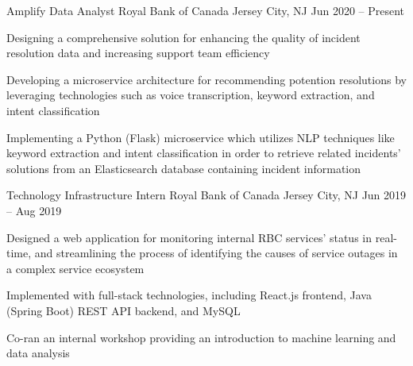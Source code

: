 

\begin{cventries}

  \cventry
	{Amplify Data Analyst}
	{Royal Bank of Canada}
	{Jersey City, NJ}
	{Jun 2020 – Present}
	{
    \begin{cvitems}
		  \item {Designing a comprehensive solution for enhancing the quality of incident resolution data and increasing support team efficiency}
		  \item {Developing a microservice architecture for recommending potention resolutions by leveraging technologies such as voice transcription, keyword extraction, and intent classification}
		  \item {Implementing a Python (Flask) microservice which utilizes NLP techniques like keyword extraction and intent classification in order to retrieve related incidents' solutions from an Elasticsearch database containing incident information}
    \end{cvitems}
  }
  
  
  \cventry
  {Technology Infrastructure Intern}
  {Royal Bank of Canada}
  {Jersey City, NJ}
  {Jun 2019 -- Aug 2019}
  {
    \begin{cvitems}
      \item {Designed a web application for monitoring internal RBC services' status in real-time, and streamlining the process of identifying the causes of service outages in a complex service ecosystem}
      \item {Implemented with full-stack technologies, including React.js frontend, Java (Spring Boot) REST API backend, and MySQL}
      \item {Co-ran an internal workshop providing an introduction to machine learning and data analysis}
    \end{cvitems}
  }



\end{cventries}
